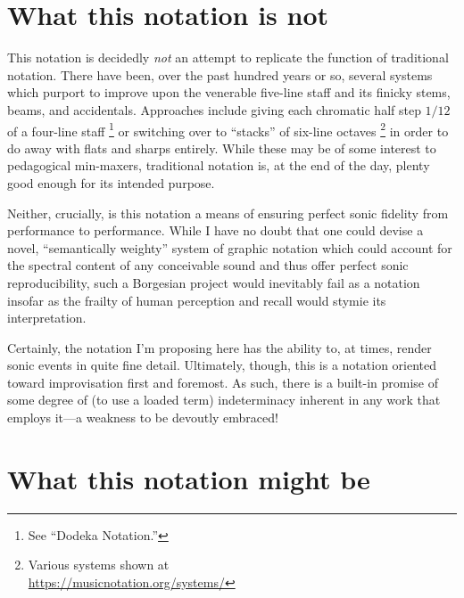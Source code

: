 \documentclass[twoside, 11pt]{book}
\let\oldfootnote\footnote
\renewcommand\footnote[1]{%
\oldfootnote{\enspace #1}}
\begin{document}
        
    \section{What this notation is not}

    This notation is decidedly \textit{not} an attempt to replicate the function of traditional notation. There have been, over the past hundred years or so, several systems which purport to improve upon the venerable five-line staff and its finicky stems, beams, and accidentals. Approaches include giving each chromatic half step $1/12$ of a four-line staff\footnote{See ``Dodeka Notation.''} or switching over to ``stacks'' of six-line octaves\footnote{Various systems shown at \\ \url{https://musicnotation.org/systems/}} in order to do away with flats and sharps entirely. While these may be of some interest to pedagogical min-maxers, traditional notation is, at the end of the day, plenty good enough for its intended purpose.

    Neither, crucially, is this notation a means of ensuring perfect sonic fidelity from performance to performance. While I have no doubt that one could devise a novel, ``semantically weighty'' system of graphic notation which could account for the spectral content of any conceivable sound and thus offer perfect sonic reproducibility, such a Borgesian project would inevitably fail as a notation insofar as the frailty of human perception and recall would stymie its interpretation.
        
    Certainly, the notation I'm proposing here has the ability to, at times, render sonic events in quite fine detail. Ultimately, though, this is a notation oriented toward improvisation first and foremost. As such, there is a built-in promise of some degree of (to use a loaded term) indeterminacy  inherent in any work that employs it---a weakness to be devoutly embraced!

            
    \section{What this notation might be}
\end{document}
